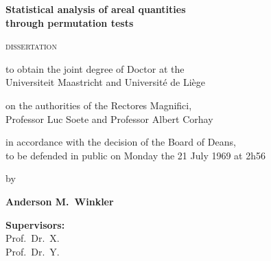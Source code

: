 \pagestyle{empty}
\vspace*{3cm}
\vspace*{\fill}
\begin{center}
\begin{Huge}
\textbf{Statistical analysis of areal quantities\\through permutation tests}
\end{Huge}
\end{center}

\vfill

\begin{center}
\textsc{dissertation}

\vfill

to obtain the joint degree of Doctor at the\\
Universiteit Maastricht and Universit\'{e} de Li\`{e}ge

\vfill

on the authorities of the Rectores Magnifici,\\
Professor Luc Soete and Professor Albert Corhay

\vfill

in accordance with the decision of the Board of Deans,\\
to be defended in public on Monday the 21 July 1969 at 2h56

\vfill

by
\end{center}

\vfill

\begin{center}
\begin{Large}
\textbf{Anderson M.\ Winkler}
\end{Large}
\end{center}

\vspace*{3cm}
\vspace*{\fill}

\newpage
{}
\noindent
\textbf{Supervisors:}\\
Prof.\ Dr.\ X.\\
Prof.\ Dr.\ Y.

